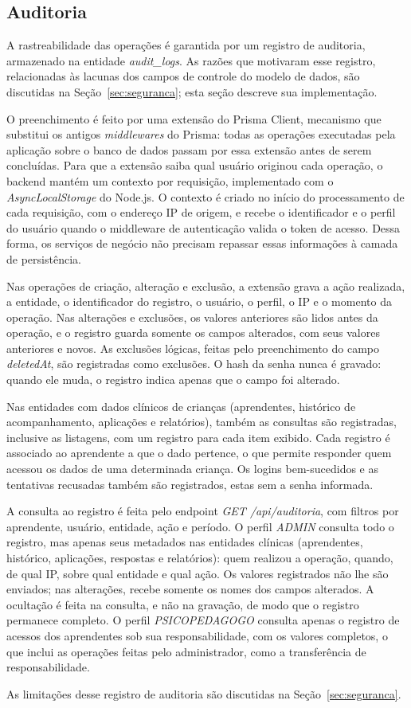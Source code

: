 \subsection{Auditoria}

A rastreabilidade das operações é garantida por um registro de auditoria, armazenado na entidade \textit{audit\_logs}. As razões que motivaram esse registro, relacionadas às lacunas dos campos de controle do modelo de dados, são discutidas na Seção~\ref{sec:seguranca}; esta seção descreve sua implementação.

O preenchimento é feito por uma extensão do Prisma Client, mecanismo que substitui os antigos \textit{middlewares} do Prisma: todas as operações executadas pela aplicação sobre o banco de dados passam por essa extensão antes de serem concluídas. Para que a extensão saiba qual usuário originou cada operação, o backend mantém um contexto por requisição, implementado com o \textit{AsyncLocalStorage} do Node.js. O contexto é criado no início do processamento de cada requisição, com o endereço IP de origem, e recebe o identificador e o perfil do usuário quando o middleware de autenticação valida o token de acesso. Dessa forma, os serviços de negócio não precisam repassar essas informações à camada de persistência.

Nas operações de criação, alteração e exclusão, a extensão grava a ação realizada, a entidade, o identificador do registro, o usuário, o perfil, o IP e o momento da operação. Nas alterações e exclusões, os valores anteriores são lidos antes da operação, e o registro guarda somente os campos alterados, com seus valores anteriores e novos. As exclusões lógicas, feitas pelo preenchimento do campo \textit{deletedAt}, são registradas como exclusões. O hash da senha nunca é gravado: quando ele muda, o registro indica apenas que o campo foi alterado.

Nas entidades com dados clínicos de crianças (aprendentes, histórico de acompanhamento, aplicações e relatórios), também as consultas são registradas, inclusive as listagens, com um registro para cada item exibido. Cada registro é associado ao aprendente a que o dado pertence, o que permite responder quem acessou os dados de uma determinada criança. Os logins bem-sucedidos e as tentativas recusadas também são registrados, estas sem a senha informada.

A consulta ao registro é feita pelo endpoint \textit{GET /api/auditoria}, com filtros por aprendente, usuário, entidade, ação e período. O perfil \textit{ADMIN} consulta todo o registro, mas apenas seus metadados nas entidades clínicas (aprendentes, histórico, aplicações, respostas e relatórios): quem realizou a operação, quando, de qual IP, sobre qual entidade e qual ação. Os valores registrados não lhe são enviados; nas alterações, recebe somente os nomes dos campos alterados. A ocultação é feita na consulta, e não na gravação, de modo que o registro permanece completo. O perfil \textit{PSICOPEDAGOGO} consulta apenas o registro de acessos dos aprendentes sob sua responsabilidade, com os valores completos, o que inclui as operações feitas pelo administrador, como a transferência de responsabilidade.

As limitações desse registro de auditoria são discutidas na Seção~\ref{sec:seguranca}.